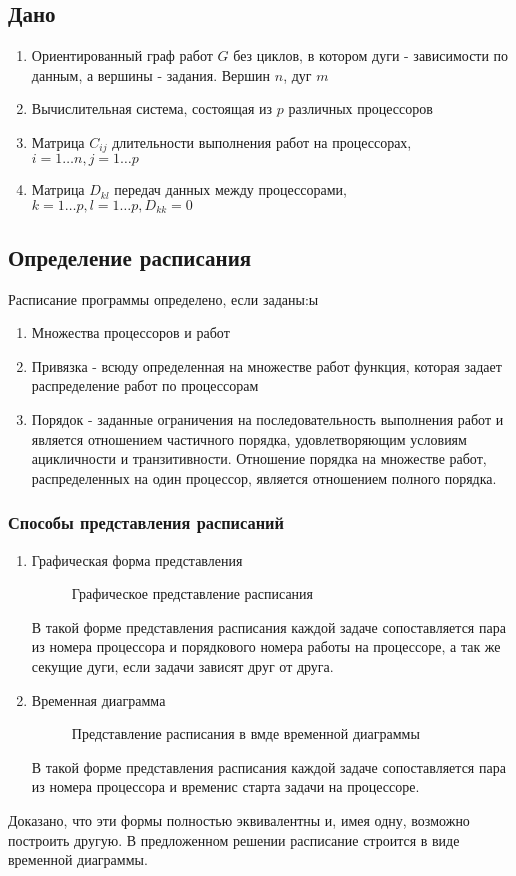 \subsection*{Дано}
\begin{enumerate}
    \item Ориентированный граф работ $G$ без циклов, в котором дуги - зависимости по данным, а вершины - задания. Вершин $n$, дуг $m$
    \item Вычислительная система, состоящая из $p$ различных процессоров
    \item Матрица $C_{ij}$ длительности выполнения работ на процессорах, $i=1 \dots n, j=1 \dots p$
    \item Матрица $D_{kl}$ передач данных между процессорами, $k=1 \dots p, l = 1 \dots p, D_{kk} = 0$
\end{enumerate}
\subsection*{Определение расписания}
Расписание программы определено, если заданы:ы
\begin{enumerate}
    \item Множества процессоров и работ
    \item Привязка - всюду определенная на множестве работ функция, которая задает распределение работ по процессорам
    \item Порядок - заданные ограничения на последовательность выполнения работ и является отношением частичного порядка, удовлетворяющим условиям ацикличности и транзитивности. Отношение порядка на множестве работ, распределенных на один процессор, является отношением полного порядка.
\end{enumerate}
\subsubsection*{Способы представления расписаний}
\begin{enumerate}
    \item Графическая форма представления
    \begin{figure}[H]
        \caption{Графическое представление расписания}
    \end{figure}
    В такой форме представления расписания каждой задаче сопоставляется пара из номера процессора и порядкового номера работы на процессоре, а так же секущие дуги, если задачи зависят друг от друга. 
    \item Временная диаграмма
    \begin{figure}[H]
        \caption{Представление расписания в вмде временной диаграммы}
    \end{figure}
    В такой форме представления расписания каждой задаче сопоставляется пара из номера процессора и временис старта задачи на процессоре.
\end{enumerate}
Доказано, что эти формы полностью эквивалентны и, имея одну, возможно построить другую. В предложенном решении расписание строится в виде временной диаграммы.

